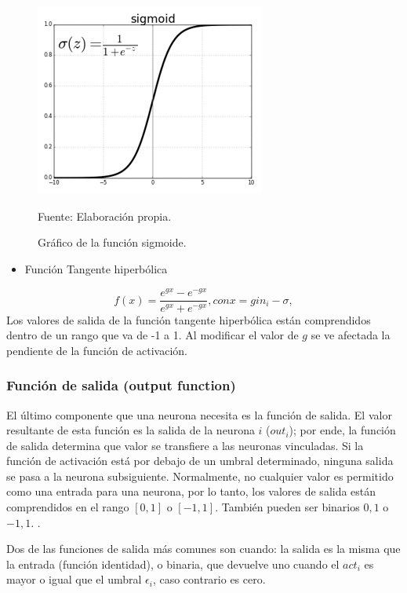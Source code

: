 \begin{figure}[h!]
	\centering
		\includegraphics[scale=0.6]{imagenes/Funcionsigmoidea.png}
		\caption{Gráfico de la función sigmoide.}
		\begin{center}
    Fuente: Elaboración propia.
    \end{center}
	\label{fig:Funcionsigmoidea}
\end{figure}
\begin{itemize}
    \item Función Tangente hiperbólica
\end{itemize}

\begin{equation}
f(x)= \frac{e^{gx}-e^{-gx}}{e^{gx}+e^{-gx}}, con x=gin_{i}-\sigma,
\end{equation}
Los valores de salida de la función tangente hiperbólica están comprendidos dentro de un rango que va de -1 a 1. Al modificar el valor de $g$ se ve afectada la pendiente de la función de activación. 

\subsubsection{Función de salida (output function)}
El último componente que una neurona necesita es la función de salida. El valor resultante de esta función es la salida de la neurona $i$ ($out_{i}$); por ende, la función de salida determina que valor se transfiere a las neuronas vinculadas. Si la función de
activación está por debajo de un umbral determinado, ninguna salida se pasa a la neurona subsiguiente. Normalmente, no cualquier valor es permitido como una entrada para una neurona, por lo tanto, los valores de salida están comprendidos en el rango
$[0, 1]$ o $[-1, 1]$. También pueden ser binarios ${0, 1}$ o ${-1, 1}$. \citep{matich2001redes}.

Dos de las funciones de salida más comunes son cuando: la salida es la misma que la entrada (función identidad), o binaria, que devuelve uno cuando el $act_{i}$ es mayor  o igual que el umbral $\epsilon_{i}$, caso contrario es cero. 

